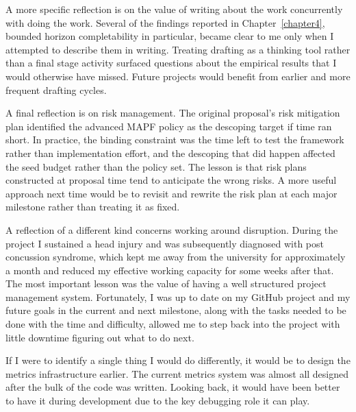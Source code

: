 \begin{appendices}
\vspace{1em}

A more specific reflection is on the value of writing about the work concurrently with doing the work. Several of the findings reported in Chapter~\ref{chapter4}, bounded horizon completability in particular, became clear to me only when I attempted to describe them in writing. Treating drafting as a thinking tool rather than a final stage activity surfaced questions about the empirical results that I would otherwise have missed. Future projects would benefit from earlier and more frequent drafting cycles.\par

\vspace{1em}

A final reflection is on risk management. The original proposal's risk mitigation plan identified the advanced MAPF policy as the descoping target if time ran short. In practice, the binding constraint was the time left to test the framework rather than implementation effort, and the descoping that did happen affected the seed budget rather than the policy set. The lesson is that risk plans constructed at proposal time tend to anticipate the wrong risks. A more useful approach next time would be to revisit and rewrite the risk plan at each major milestone rather than treating it as fixed.\par

\vspace{1em}

A reflection of a different kind concerns working around disruption. During the project I sustained a head injury and was subsequently diagnosed with post concussion syndrome, which kept me away from the university for approximately a month and reduced my effective working capacity for some weeks after that. The most important lesson was the value of having a well structured project management system. Fortunately, I was up to date on my GitHub project and my future goals in the current and next milestone, along with the tasks needed to be done with the time and difficulty, allowed me to step back into the project with little downtime figuring out what to do next. \par

\vspace{1em}

If I were to identify a single thing I would do differently, it would be to design the metrics infrastructure earlier. The current metrics system was almost all designed after the bulk of the code was written. Looking back, it would have been better to have it during development due to the key debugging role it can play. \par


\end{appendices}
